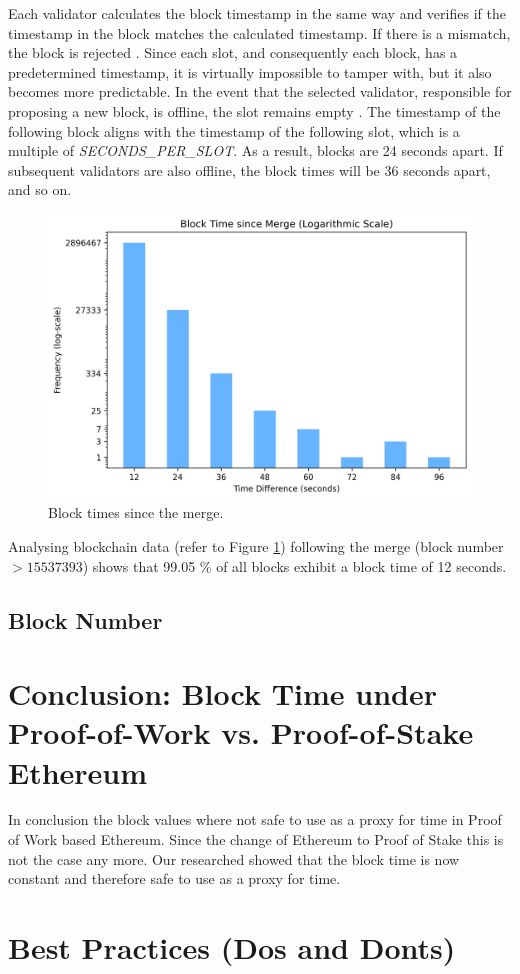 Each validator calculates the block timestamp in the same way and verifies if
the timestamp in the block matches the calculated timestamp. If there is a
mismatch, the block is rejected \cite{process-execution-payload}. Since each
slot, and consequently each block, has a predetermined timestamp, it is
virtually impossible to tamper with, but it also becomes more predictable. In
the event that the selected validator, responsible for proposing a new block,
is offline, the slot remains empty \cite{validator-offline}. The timestamp of
the following block aligns with the timestamp of the following slot, which is a
multiple of \textit{SECONDS\_PER\_SLOT}. As a result, blocks are 24 seconds
apart. If subsequent validators are also offline, the block times will be 36
seconds apart, and so on.

\begin{figure}[H]
  \centering
  \includegraphics[width=1\textwidth]{block_time_analysis/pos_block_time_bar_chart.png}
  \caption{Block times since the merge.}
  \label{fig:block_time_analysis}
\end{figure}

Analysing blockchain data (refer to Figure \ref{fig:block_time_analysis}) following the
merge (block number $> 15537393$) shows that 99.05 \% of all blocks exhibit a
block time of 12 seconds.

\subsection{Block Number}

\section{Conclusion: Block Time under Proof-of-Work vs. Proof-of-Stake Ethereum}
In conclusion the block values where not safe to use as a proxy for time in 
Proof of Work based Ethereum. Since the change of Ethereum to Proof of Stake this is not the case any more.
Our researched showed that the block time is now constant and therefore safe to use as a proxy for time.

\section{Best Practices (Dos and Donts)}


